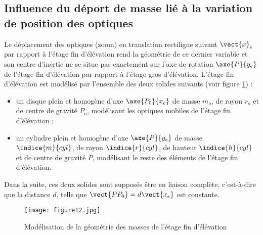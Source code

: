 
\subsection{Influence du déport de masse lié à la variation de position des optiques}

Le déplacement des optiques (zoom) en translation rectiligne suivant $\vect{x}_e$ par rapport à l'étage fin d'élévation
rend la géométrie de ce dernier variable et son centre d'inertie ne se situe pas exactement sur l'axe de rotation
$\axe{P}{{y_e}}$ de l'étage fin d'élévation par rapport à l'étage gros d'élévation.
L'étage fin d'élévation est modélisé par l'ensemble des deux solides suivants (voir figure \ref{figure12}) :
\begin{itemize}
\item un disque plein et homogène d'axe $\axe{P_0}{{x_e}}$ de masse $m_o$, de rayon $r_o$ et de centre de gravité $P_o$, modélisant les optiques mobiles de l'étage fin d'élévation ;
\item un cylindre plein et homogène d'axe $\axe{P}{{y_e}}$ de masse $\indice{m}{cyl}$, de rayon $\indice{r}{cyl}$, de hauteur $\indice{h}{cyl}$ et de centre de gravité $P$, modélisant le reste des éléments de l'étage fin d'élévation.
\end{itemize}

Dans la suite, ces deux solides sont supposés être en liaison complète, c'est-à-dire que la distance $d$, telle que $\vect{PP_0}=d\vect{x_e}$ est constante.

\begin{figure}[!htb]
\begin{center}
\texttt{[image: figure12.jpg]}
\caption{Modélisation de la géométrie des masses de l'étage fin d'élévation \label{figure12}}
\end{center}
\end{figure}

